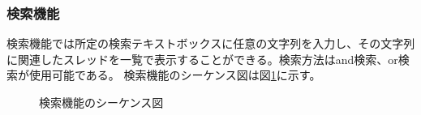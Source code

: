\documentclass[a4j]{jarticle}
\begin{document}
  \subsubsection{検索機能}
  検索機能では所定の検索テキストボックスに任意の文字列を入力し、その文字列に関連したスレッドを一覧で表示することができる。検索方法はand検索、or検索が使用可能である。
  検索機能のシーケンス図は図\ref{fig:search_keyword.png}に示す。
  \begin{figure}[H]
    \centering
    \caption{検索機能のシーケンス図}
    \label{fig:search_keyword.png}
  \end{figure}
\end{document}
